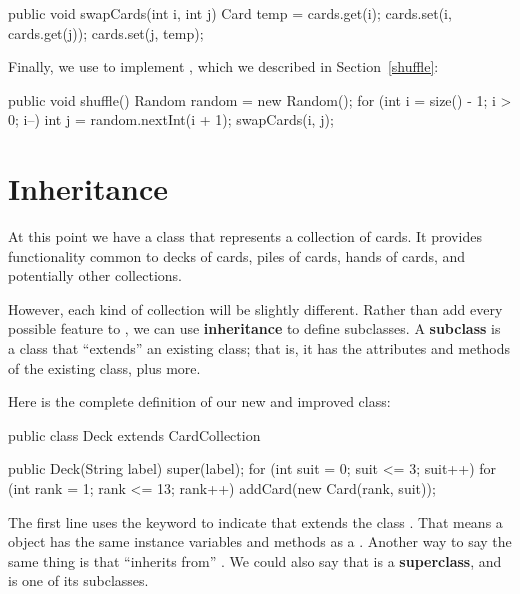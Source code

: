 \begin{code}
public void swapCards(int i, int j) {
    Card temp = cards.get(i);
    cards.set(i, cards.get(j));
    cards.set(j, temp);
}
\end{code}

Finally, we use  to implement , which we described in Section~\ref{shuffle}:

\begin{code}
public void shuffle() {
    Random random = new Random();
    for (int i = size() - 1; i > 0; i--) {
        int j = random.nextInt(i + 1);
        swapCards(i, j);
    }
}
\end{code}



\section{Inheritance}

At this point we have a class that represents a collection of cards.
It provides functionality common to decks of cards, piles of cards, hands of cards, and potentially other collections.


However, each kind of collection will be slightly different.
Rather than add every possible feature to , we can use {\bf inheritance} to define subclasses.
A {\bf subclass} is a class that ``extends'' an existing class; that is, it has the attributes and methods of the existing class, plus more.

Here is the complete definition of our new and improved  class:

\begin{code}
public class Deck extends CardCollection {

    public Deck(String label) {
        super(label);
        for (int suit = 0; suit <= 3; suit++) {
            for (int rank = 1; rank <= 13; rank++) {
                addCard(new Card(rank, suit));
            }
        }
    }
}
\end{code}


The first line uses the keyword  to indicate that  extends the class .
That means a  object has the same instance variables and methods as a .
Another way to say the same thing is that  ``inherits from'' .
We could also say that  is a {\bf superclass}, and  is one of its subclasses.

